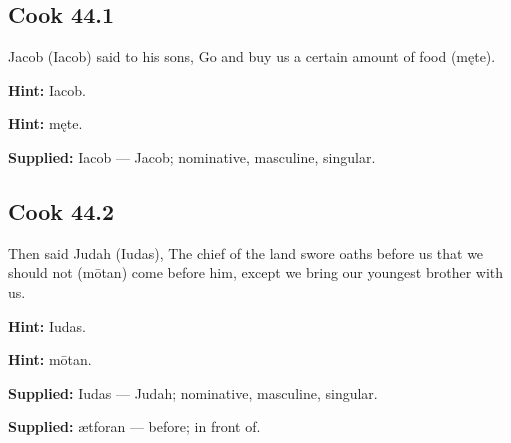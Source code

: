 \par\begin{minipage}{\linewidth}\raggedright
\subsection*{Cook 44.1}

Jacob (Iacob) said to his sons, Go and buy us a certain amount of food (męte).

\textbf{Hint:} Iacob.

\textbf{Hint:} męte.

\end{minipage}\par\addvspace{4pt}

\textbf{Supplied:} Iacob — Jacob; nominative, masculine, singular.

\par\begin{minipage}{\linewidth}\raggedright
\subsection*{Cook 44.2}

Then said Judah (Iudas), The chief of the land swore oaths before us that we should not (mōtan) come before him, except we bring our youngest brother with us.

\textbf{Hint:} Iudas.

\textbf{Hint:} mōtan.

\end{minipage}\par\addvspace{4pt}

\textbf{Supplied:} Iudas — Judah; nominative, masculine, singular.

\textbf{Supplied:} ætforan — before; in front of.

